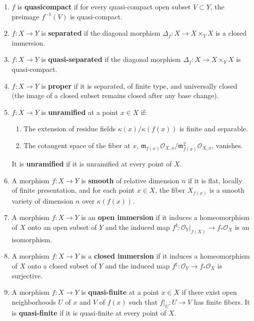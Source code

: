 \documentclass[12pt]{article}
\begin{document}
\begin{definition}
\begin{enumerate}
        \item $f$ is \textbf{quasicompact} if for every quasi-compact open subset $V \subset Y$, the preimage $f^{-1}(V)$ is quasi-compact.
        \item $f: X \to Y$ is \textbf{separated} if the diagonal morphism $\Delta_f: X \to X \times_Y X$ is a closed immersion.
        \item $f: X \to Y$ is \textbf{quasi-separated} if the diagonal morphism $\Delta_f: X \to X \times_Y X$ is quasi-compact.
        \item $f: X \to Y$ is \textbf{proper} if it is separated, of finite type, and universally closed (the image of a closed subset remains closed after any base change).
        \item $f: X \to Y$ is \textbf{unramified} at a point $x \in X$ if:
              \begin{enumerate}
                  \item The extension of residue fields $\kappa(x)/\kappa(f(x))$ is finite and separable.
                  \item The cotangent space of the fiber at $x$, $\mathfrak{m}_{f(x)}\mathcal{O}_{X,x}/\mathfrak{m}_{f(x)}^2\mathcal{O}_{X,x}$, vanishes.
              \end{enumerate}
              It is \textbf{unramified} if it is unramified at every point of $X$.
        \item A morphism $f: X \to Y$ is \textbf{smooth} of relative dimension $n$ if it is flat, locally of finite presentation, and for each point $x \in X$, the fiber $X_{f(x)}$ is a smooth variety of dimension $n$ over $\kappa(f(x))$.
        \item A morphism $f: X \to Y$ is an \textbf{open immersion} if it induces a homeomorphism of $X$ onto an open subset of $Y$ and the induced map $f^\sharp: \mathcal{O}_Y|_{f(X)} \to f_*\mathcal{O}_X$ is an isomorphism.
        \item A morphism $f: X \to Y$ is a \textbf{closed immersion} if it induces a homeomorphism of $X$ onto a closed subset of $Y$ and the induced map $f^\sharp: \mathcal{O}_Y \to f_*\mathcal{O}_X$ is surjective.
        \item A morphism $f: X \to Y$ is \textbf{quasi-finite} at a point $x \in X$ if there exist open neighborhoods $U$ of $x$ and $V$ of $f(x)$ such that $f|_U: U \to V$ has finite fibers. It is \textbf{quasi-finite} if it is quasi-finite at every point of $X$.
    \end{enumerate}
\end{definition}
\end{document}
